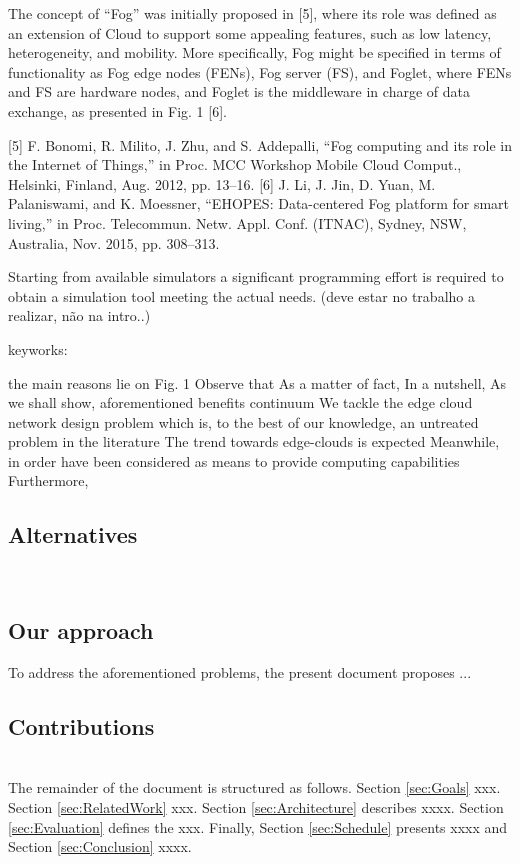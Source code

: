 The concept of “Fog” was initially proposed in [5], where
its role was defined as an extension of Cloud to support some
appealing features, such as low latency, heterogeneity, and
mobility. More specifically, Fog might be specified in terms
of functionality as Fog edge nodes (FENs), Fog server (FS),
and Foglet, where FENs and FS are hardware nodes, and
Foglet is the middleware in charge of data exchange, as
presented in Fig. 1 [6].

[5] F. Bonomi, R. Milito, J. Zhu, and S. Addepalli, “Fog computing and its
role in the Internet of Things,” in Proc. MCC Workshop Mobile Cloud
Comput., Helsinki, Finland, Aug. 2012, pp. 13–16.
[6] J. Li, J. Jin, D. Yuan, M. Palaniswami, and K. Moessner, “EHOPES:
Data-centered Fog platform for smart living,” in Proc. Telecommun.
Netw. Appl. Conf. (ITNAC), Sydney, NSW, Australia, Nov. 2015,
pp. 308–313.


Starting from available simulators a significant programming
effort is required to obtain a simulation tool meeting the actual
needs. (deve estar no trabalho a realizar, não na intro..)

keyworks:

the main reasons lie on Fig. 1
Observe that
As a matter of fact,
In a nutshell,
As we shall show,
aforementioned benefits
continuum
We tackle the edge cloud network design problem
which is, to the best of our knowledge, an untreated problem in the literature
The trend towards edge-clouds is expected
Meanwhile, in order
have been considered as means to provide computing capabilities
Furthermore, 



\subsection{Alternatives}
\noindent\tab [Alternatives]\\

\subsection{Our approach}
\noindent\tab To address the aforementioned problems, the present document proposes ...\\

\subsection{Contributions}
\noindent\tab [Contributions]\\
\noindent\tab The remainder of the document is structured as follows. Section \ref{sec:Goals} xxx. Section \ref{sec:RelatedWork} xxx. Section \ref{sec:Architecture} describes xxxx. Section \ref{sec:Evaluation} defines the xxx. Finally, Section \ref{sec:Schedule} presents xxxx and Section \ref{sec:Conclusion} xxxx.


